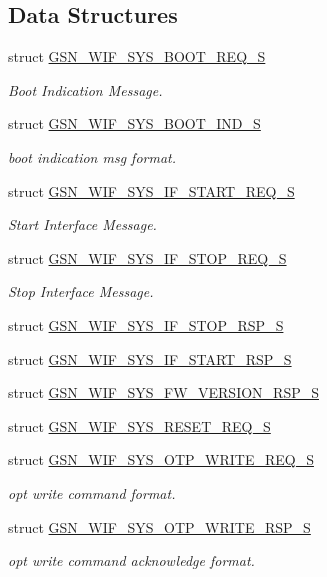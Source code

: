 \subsection*{Data Structures}
\begin{DoxyCompactItemize}
\item 
struct \hyperlink{a00348}{GSN\_\-WIF\_\-SYS\_\-BOOT\_\-REQ\_\-S}
\begin{DoxyCompactList}\small\item\em Boot Indication Message. \end{DoxyCompactList}\item 
struct \hyperlink{a00347}{GSN\_\-WIF\_\-SYS\_\-BOOT\_\-IND\_\-S}
\begin{DoxyCompactList}\small\item\em boot indication msg format. \end{DoxyCompactList}\item 
struct \hyperlink{a00353}{GSN\_\-WIF\_\-SYS\_\-IF\_\-START\_\-REQ\_\-S}
\begin{DoxyCompactList}\small\item\em Start Interface Message. \end{DoxyCompactList}\item 
struct \hyperlink{a00355}{GSN\_\-WIF\_\-SYS\_\-IF\_\-STOP\_\-REQ\_\-S}
\begin{DoxyCompactList}\small\item\em Stop Interface Message. \end{DoxyCompactList}\item 
struct \hyperlink{a00356}{GSN\_\-WIF\_\-SYS\_\-IF\_\-STOP\_\-RSP\_\-S}
\item 
struct \hyperlink{a00354}{GSN\_\-WIF\_\-SYS\_\-IF\_\-START\_\-RSP\_\-S}
\item 
struct \hyperlink{a00352}{GSN\_\-WIF\_\-SYS\_\-FW\_\-VERSION\_\-RSP\_\-S}
\item 
struct \hyperlink{a00362}{GSN\_\-WIF\_\-SYS\_\-RESET\_\-REQ\_\-S}
\item 
struct \hyperlink{a00360}{GSN\_\-WIF\_\-SYS\_\-OTP\_\-WRITE\_\-REQ\_\-S}
\begin{DoxyCompactList}\small\item\em opt write command format. \end{DoxyCompactList}\item 
struct \hyperlink{a00361}{GSN\_\-WIF\_\-SYS\_\-OTP\_\-WRITE\_\-RSP\_\-S}
\begin{DoxyCompactList}\small\item\em opt write command acknowledge format. \end{DoxyCompactList}\item 

\end{DoxyCompactItemize}
